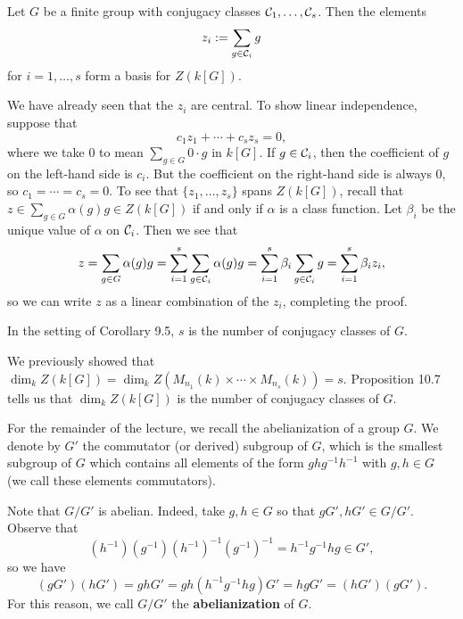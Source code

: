 \begin{prop}
    Let $G$ be a finite group with conjugacy classes ${\cal C}_1, 
    \dots, {\cal C}_s$. Then the elements 
    \[ z_i := \sum_{g \in {\cal C}_i} g \] 
    for $i = 1, \dots, s$ form a basis for $Z(k[G])$. 
\end{prop} 
\begin{pf}
    We have already seen that the $z_i$ are central. To show 
    linear independence, suppose that 
    \[ c_1 z_1 + \cdots + c_s z_s = 0, \] 
    where we take $0$ to mean $\sum_{g \in G} 0 \cdot g$ in $k[G]$. 
    If $g \in {\cal C}_i$, then the coefficient of $g$ on the left-hand 
    side is $c_i$. But the coefficient on the right-hand side is 
    always $0$, so $c_1 = \cdots = c_s = 0$. To see that 
    $\{z_1, \dots, z_s\}$ spans $Z(k[G])$, recall that 
    $z \in \sum_{g \in G} \alpha(g)g \in Z(k[G])$ if and only if 
    $\alpha$ is a class function. Let $\beta_i$ be the unique value 
    of $\alpha$ on ${\cal C}_i$. Then we see that 
    \[ z = \sum_{g \in G} \alpha(g)g = \sum_{i=1}^s \sum_{g \in {\cal C}_i} 
    \alpha(g)g = \sum_{i=1}^s \beta_i \sum_{g \in {\cal C}_i} g 
    = \sum_{i=1}^s \beta_i z_i, \] 
    so we can write $z$ as a linear combination of the $z_i$, completing the 
    proof. 
\end{pf}

\begin{thm}
    In the setting of Corollary 9.5, $s$ is the number of conjugacy 
    classes of $G$. 
\end{thm} 
\begin{pf}
    We previously showed that $\dim_k Z(k[G]) = \dim_k Z(M_{n_1}(k) \times 
    \cdots \times M_{n_s}(k)) = s$. Proposition 10.7 tells us that 
    $\dim_k Z(k[G])$ is the number of conjugacy classes of $G$. 
\end{pf} 

For the remainder of the lecture, we recall the abelianization of a group $G$.
We denote by $G'$ the commutator (or derived) subgroup of $G$, which is the 
smallest subgroup of $G$ which contains all elements of the form 
$ghg^{-1}h^{-1}$ with $g, h \in G$ (we call these elements commutators). 

Note that $G/G'$ is abelian. Indeed, take $g, h \in G$ so that 
$gG', hG' \in G/G'$. Observe that 
\[ (h^{-1})(g^{-1})(h^{-1})^{-1}(g^{-1})^{-1} = 
    h^{-1}g^{-1}hg \in G', \] 
so we have 
\[ (gG')(hG') = ghG' = gh(h^{-1}g^{-1}hg)G' = hgG' = (hG')(gG'). \]
For this reason, we call $G/G'$ the {\bf abelianization} of $G$. 

